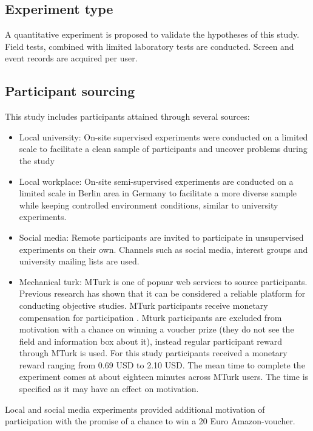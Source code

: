 \subsection{Experiment type} A quantitative experiment is proposed to validate the hypotheses of this study. Field tests, combined with limited laboratory tests are conducted. Screen and event records are acquired per user.

\subsection{Participant sourcing} 
This study includes participants attained through several sources:
\begin{itemize}
	\item{Local university:} On-site supervised experiments were conducted on a limited scale to facilitate a clean sample of participants and uncover problems during the study
	
	\item{Local workplace:} On-site semi-supervised experiments are conducted on a limited scale in Berlin area in Germany to facilitate a more diverse sample while keeping controlled environment conditions, similar to university experiments.
	
	\item{Social media:} Remote participants are invited to participate in unsupervised experiments on their own. Channels such as social media, interest groups and university mailing lists are used.
	
	\item{Mechanical turk:} MTurk is one of popuar web services to source participants. Previous research has shown that it can be considered a reliable platform for conducting objective studies. MTurk participants receive monetary compensation for participation \cite{Buhrmester2011a}. Mturk participants are excluded from motivation with a chance on winning a voucher prize (they do not see the field and information box about it), instead regular participant reward through MTurk is used. For this study participants received a monetary reward ranging from 0.69 USD to 2.10 USD. The mean time to complete the experiment comes at about eighteen minutes across MTurk users. The time is specified as it may have an effect on motivation.
	
\end{itemize}

Local and social media experiments provided additional motivation of participation with the promise of a chance to win a 20 Euro Amazon-voucher.